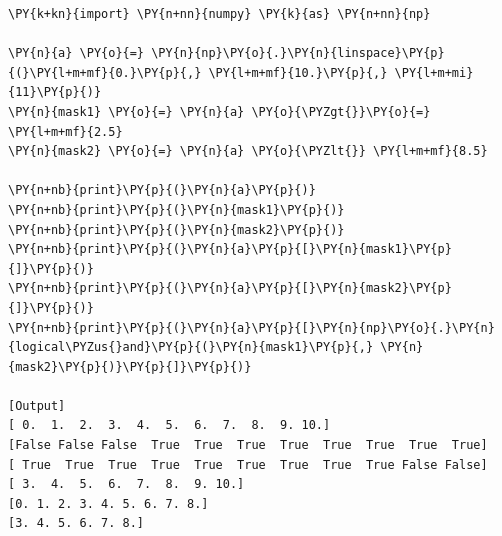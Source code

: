 \begin{Verbatim}[label=\makebox{\url{https://github.com/lucabaldini/cmepda/tree/master/slides/latex/snippets/numpy\_masks.py}},commandchars=\\\{\}]
\PY{k+kn}{import} \PY{n+nn}{numpy} \PY{k}{as} \PY{n+nn}{np}

\PY{n}{a} \PY{o}{=} \PY{n}{np}\PY{o}{.}\PY{n}{linspace}\PY{p}{(}\PY{l+m+mf}{0.}\PY{p}{,} \PY{l+m+mf}{10.}\PY{p}{,} \PY{l+m+mi}{11}\PY{p}{)}
\PY{n}{mask1} \PY{o}{=} \PY{n}{a} \PY{o}{\PYZgt{}}\PY{o}{=} \PY{l+m+mf}{2.5}
\PY{n}{mask2} \PY{o}{=} \PY{n}{a} \PY{o}{\PYZlt{}} \PY{l+m+mf}{8.5}

\PY{n+nb}{print}\PY{p}{(}\PY{n}{a}\PY{p}{)}
\PY{n+nb}{print}\PY{p}{(}\PY{n}{mask1}\PY{p}{)}
\PY{n+nb}{print}\PY{p}{(}\PY{n}{mask2}\PY{p}{)}
\PY{n+nb}{print}\PY{p}{(}\PY{n}{a}\PY{p}{[}\PY{n}{mask1}\PY{p}{]}\PY{p}{)}
\PY{n+nb}{print}\PY{p}{(}\PY{n}{a}\PY{p}{[}\PY{n}{mask2}\PY{p}{]}\PY{p}{)}
\PY{n+nb}{print}\PY{p}{(}\PY{n}{a}\PY{p}{[}\PY{n}{np}\PY{o}{.}\PY{n}{logical\PYZus{}and}\PY{p}{(}\PY{n}{mask1}\PY{p}{,} \PY{n}{mask2}\PY{p}{)}\PY{p}{]}\PY{p}{)}

[Output]
[ 0.  1.  2.  3.  4.  5.  6.  7.  8.  9. 10.]
[False False False  True  True  True  True  True  True  True  True]
[ True  True  True  True  True  True  True  True  True False False]
[ 3.  4.  5.  6.  7.  8.  9. 10.]
[0. 1. 2. 3. 4. 5. 6. 7. 8.]
[3. 4. 5. 6. 7. 8.]
\end{Verbatim}